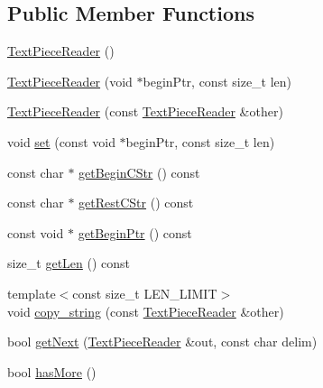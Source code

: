 \subsection*{Public Member Functions}
\begin{DoxyCompactItemize}
\item 
\hyperlink{classuva_1_1smt_1_1file_1_1_text_piece_reader_a5bcd100aa3c0984c2326066b4f155b10}{Text\+Piece\+Reader} ()
\item 
\hyperlink{classuva_1_1smt_1_1file_1_1_text_piece_reader_a5d3cb8d1adf59e10d6797109206b6522}{Text\+Piece\+Reader} (void $\ast$begin\+Ptr, const size\+\_\+t len)
\item 
\hyperlink{classuva_1_1smt_1_1file_1_1_text_piece_reader_a5e2d04dd3f4dcada72e35a3f7f456070}{Text\+Piece\+Reader} (const \hyperlink{classuva_1_1smt_1_1file_1_1_text_piece_reader}{Text\+Piece\+Reader} \&other)
\item 
void \hyperlink{classuva_1_1smt_1_1file_1_1_text_piece_reader_ad31a44734767675d0d328ba6018fc9fa}{set} (const void $\ast$begin\+Ptr, const size\+\_\+t len)
\item 
const char $\ast$ \hyperlink{classuva_1_1smt_1_1file_1_1_text_piece_reader_a5732742734c4409ecba7c227d411c6b6}{get\+Begin\+C\+Str} () const 
\item 
const char $\ast$ \hyperlink{classuva_1_1smt_1_1file_1_1_text_piece_reader_a50ab7593dd43651919e9791b63e01691}{get\+Rest\+C\+Str} () const 
\item 
const void $\ast$ \hyperlink{classuva_1_1smt_1_1file_1_1_text_piece_reader_afe9a17874ce95a5e60df233d0f2aded3}{get\+Begin\+Ptr} () const 
\item 
size\+\_\+t \hyperlink{classuva_1_1smt_1_1file_1_1_text_piece_reader_a4fe8c4375d0d75ac58c3d53de5dfac3d}{get\+Len} () const 
\item 
{\footnotesize template$<$const size\+\_\+t L\+E\+N\+\_\+\+L\+I\+M\+I\+T$>$ }\\void \hyperlink{classuva_1_1smt_1_1file_1_1_text_piece_reader_ad7a41a387a694a440a8d94504e06b113}{copy\+\_\+string} (const \hyperlink{classuva_1_1smt_1_1file_1_1_text_piece_reader}{Text\+Piece\+Reader} \&other)
\item 
bool \hyperlink{classuva_1_1smt_1_1file_1_1_text_piece_reader_a09bfe7985da8364ac7d8c2ece54fedbe}{get\+Next} (\hyperlink{classuva_1_1smt_1_1file_1_1_text_piece_reader}{Text\+Piece\+Reader} \&out, const char delim)
\item 
bool \hyperlink{classuva_1_1smt_1_1file_1_1_text_piece_reader_a29018a380d0ca964589afee875c74fec}{has\+More} ()

\end{DoxyCompactItemize}
